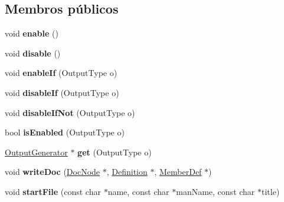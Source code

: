 \subsection*{Membros públicos}
\begin{DoxyCompactItemize}
\item 
\hypertarget{class_r_t_f_generator_a486f22824bd83c5308a0d70ffac6f758}{void {\bfseries enable} ()}\label{class_r_t_f_generator_a486f22824bd83c5308a0d70ffac6f758}

\item 
\hypertarget{class_r_t_f_generator_a8cfbbe53c1cf6e3054736daea3044c0f}{void {\bfseries disable} ()}\label{class_r_t_f_generator_a8cfbbe53c1cf6e3054736daea3044c0f}

\item 
\hypertarget{class_r_t_f_generator_a4cb683868aced938e5825344efcabbac}{void {\bfseries enable\-If} (Output\-Type o)}\label{class_r_t_f_generator_a4cb683868aced938e5825344efcabbac}

\item 
\hypertarget{class_r_t_f_generator_a7631c8cb9b2794dd29fbf9fc4f4e3fdc}{void {\bfseries disable\-If} (Output\-Type o)}\label{class_r_t_f_generator_a7631c8cb9b2794dd29fbf9fc4f4e3fdc}

\item 
\hypertarget{class_r_t_f_generator_a50896e6fa0a1ae81a11e07bc2d86bcbb}{void {\bfseries disable\-If\-Not} (Output\-Type o)}\label{class_r_t_f_generator_a50896e6fa0a1ae81a11e07bc2d86bcbb}

\item 
\hypertarget{class_r_t_f_generator_a79a2b8ce4bca9910d02b7a54ea547aba}{bool {\bfseries is\-Enabled} (Output\-Type o)}\label{class_r_t_f_generator_a79a2b8ce4bca9910d02b7a54ea547aba}

\item 
\hypertarget{class_r_t_f_generator_a256fd8270e935e213d393fb88d0f3737}{\hyperlink{class_output_generator}{Output\-Generator} $\ast$ {\bfseries get} (Output\-Type o)}\label{class_r_t_f_generator_a256fd8270e935e213d393fb88d0f3737}

\item 
\hypertarget{class_r_t_f_generator_a3cd433489757d690eee323e816d9c663}{void {\bfseries write\-Doc} (\hyperlink{class_doc_node}{Doc\-Node} $\ast$, \hyperlink{class_definition}{Definition} $\ast$, \hyperlink{class_member_def}{Member\-Def} $\ast$)}\label{class_r_t_f_generator_a3cd433489757d690eee323e816d9c663}

\item 
\hypertarget{class_r_t_f_generator_a642331f37add1aa818a86124a5fe4723}{void {\bfseries start\-File} (const char $\ast$name, const char $\ast$man\-Name, const char $\ast$title)}\label{class_r_t_f_generator_a642331f37add1aa818a86124a5fe4723}


\end{DoxyCompactItemize}
